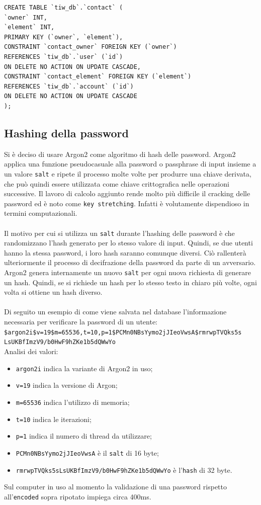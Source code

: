 \documentclass{article}
\begin{document}
\begin{verbatim}
CREATE TABLE `tiw_db`.`contact` (
`owner` INT,
`element` INT,
PRIMARY KEY (`owner`, `element`),
CONSTRAINT `contact_owner` FOREIGN KEY (`owner`) 
REFERENCES `tiw_db`.`user` (`id`)
ON DELETE NO ACTION ON UPDATE CASCADE,
CONSTRAINT `contact_element` FOREIGN KEY (`element`) 
REFERENCES `tiw_db`.`account` (`id`) 
ON DELETE NO ACTION ON UPDATE CASCADE
);
\end{verbatim}

\subsection{Hashing della password}
Si è deciso di usare Argon2 come algoritmo di hash delle password. Argon2 applica una funzione pseudocasuale alla password o passphrase di input insieme a un valore \texttt{salt} e ripete il processo molte volte per produrre una chiave derivata, che può quindi essere utilizzata come chiave crittografica nelle operazioni successive. Il lavoro di calcolo aggiunto rende molto più difficile il cracking delle password ed è noto come \texttt{key stretching}. Infatti è volutamente dispendioso in termini computazionali.
\\\\
Il motivo per cui si utilizza un \texttt{salt} durante l'hashing delle password è che randomizzano l'hash generato per lo stesso valore di input. Quindi, se due utenti hanno la stessa password, i loro hash saranno comunque diversi. Ciò rallenterà ulteriormente il processo di decifrazione della password da parte di un avversario.
\\
Argon2 genera internamente un nuovo \texttt{salt} per ogni nuova richiesta di generare un hash. Quindi, se si richiede un hash per lo stesso testo in chiaro più volte, ogni volta si ottiene un hash diverso. 
\\ \\
Di seguito un esempio di come viene salvata nel database l'informazione necessaria per verificare la password di un utente:\\ \texttt{\$argon2i\$v=19\$m=65536,t=10,p=1\$PCMn0NBsYymo2jJIeoVwsA\$rmrwpTVQks5s\\LsUKBfImzV9/b0HwF9hZKe1b5dQWwYo}
\\
Analisi dei valori:
\begin{itemize}
\item \texttt{argon2i} indica la  variante di Argon2 in uso;
\item \texttt{v=19} indica la versione di Argon;
\item \texttt{m=65536} indica l'utilizzo di memoria;
\item \texttt{t=10} indica le iterazioni;
\item \texttt{p=1} indica il numero di thread da utilizzare;
\item \texttt{PCMn0NBsYymo2jJIeoVwsA} è il \texttt{salt} di 16 byte;
\item \texttt{rmrwpTVQks5sLsUKBfImzV9/b0HwF9hZKe1b5dQWwYo} è l'\texttt{hash} di 32 byte.
\end{itemize}
Sul computer in uso al momento la validazione di una password rispetto all'\texttt{encoded} sopra ripotato impiega circa 400ms. 
\end{document}

